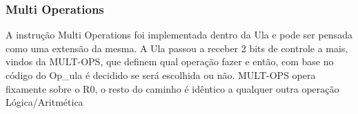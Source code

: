 \documentclass{article}
\begin{document}
    \begin{table}[H]
      \captionsetup{labelformat=empty, skip=0pt}
      \caption{\textbf{Lane 3 e 4 Controle: Aritmética e Lógica}}
      \centering
    \end{table}

    \subsubsection{Multi Operations}

    A instrução Multi Operations foi implementada dentro da Ula e pode ser pensada como uma extensão da mesma. A Ula passou a receber 2 bits de controle a mais, vindos da MULT-OPS, que definem qual operação fazer e então, com base no código do Op\_ula é decidido se será escolhida ou não.
    MULT-OPS opera fixamente sobre o R0, o resto do caminho é idêntico a qualquer outra operação Lógica/Aritmética
\end{document}

